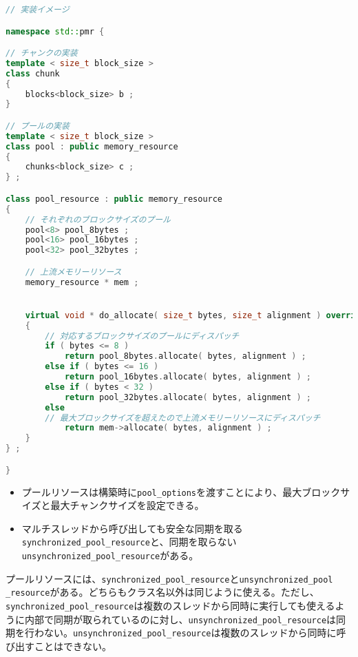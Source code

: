 \begin{lstlisting}[language=C++]
// 実装イメージ

namespace std::pmr {

// チャンクの実装
template < size_t block_size >
class chunk
{
    blocks<block_size> b ;
}

// プールの実装
template < size_t block_size >
class pool : public memory_resource
{
    chunks<block_size> c ;
} ;

class pool_resource : public memory_resource
{
    // それぞれのブロックサイズのプール
    pool<8> pool_8bytes ;
    pool<16> pool_16bytes ;
    pool<32> pool_32bytes ;

    // 上流メモリーリソース
    memory_resource * mem ;


    virtual void * do_allocate( size_t bytes, size_t alignment ) override
    {
        // 対応するブロックサイズのプールにディスパッチ
        if ( bytes <= 8 )
            return pool_8bytes.allocate( bytes, alignment ) ;
        else if ( bytes <= 16 )
            return pool_16bytes.allocate( bytes, alignment ) ;
        else if ( bytes < 32 )
            return pool_32bytes.allocate( bytes, alignment ) ;
        else
        // 最大ブロックサイズを超えたので上流メモリーリソースにディスパッチ
            return mem->allocate( bytes, alignment ) ;
    }
} ;

}
\end{lstlisting}

\begin{itemize}[leftmargin=*]
\item
  プールリソースは構築時に\lstinline!pool_options!を渡すことにより、最大ブロックサイズと最大チャンクサイズを設定できる。
\item
  マルチスレッドから呼び出しても安全な同期を取る\lstinline!synchronized_pool_resource!と、同期を取らない\lstinline!unsynchronized_pool_resource!がある。
\end{itemize}

%

プールリソースには、\lstinline!synchronized_pool_resource!と\lstinline[breaklines=true]!unsynchronized_pool _resource!がある。どちらもクラス名以外は同じように使える。ただし、\lstinline!synchronized_pool_resource!は複数のスレッドから同時に実行しても使えるように内部で同期が取られているのに対し、\lstinline!unsynchronized_pool_resource!は同期を行わない。\lstinline!unsynchronized_pool_resource!は複数のスレッドから同時に呼び出すことはできない。

